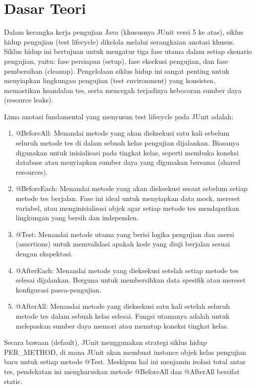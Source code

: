 \documentclass[a4paper,12pt]{article}
\begin{document}
\section{Dasar Teori}
Dalam kerangka kerja pengujian Java (khususnya JUnit versi 5 ke atas), siklus hidup pengujian (test lifecycle) dikelola melalui serangkaian anotasi khusus. Siklus hidup ini bertujuan untuk mengatur tiga fase utama dalam setiap skenario pengujian, yaitu: fase persiapan (setup), fase eksekusi pengujian, dan fase pembersihan (cleanup). Pengelolaan siklus hidup ini sangat penting untuk menyiapkan lingkungan pengujian (test environment) yang konsisten, memastikan keandalan tes, serta mencegah terjadinya kebocoran sumber daya (resource leaks).

Lima anotasi fundamental yang menyusun test lifecycle pada JUnit adalah:
\begin{enumerate}
    \item @BeforeAll: Menandai metode yang akan dieksekusi satu kali sebelum seluruh metode tes di dalam sebuah kelas pengujian dijalankan. Biasanya digunakan untuk inisialisasi pada tingkat kelas, seperti membuka koneksi database atau menyiapkan sumber daya yang digunakan bersama (shared resources).
    
    \item @BeforeEach: Menandai metode yang akan dieksekusi sesaat sebelum setiap metode tes berjalan. Fase ini ideal untuk menyiapkan data mock, mereset variabel, atau menginisialisasi objek agar setiap metode tes mendapatkan lingkungan yang bersih dan independen.
    
    \item @Test: Menandai metode utama yang berisi logika pengujian dan asersi (assertions) untuk memvalidasi apakah kode yang diuji berjalan sesuai dengan ekspektasi.
    
    \item @AfterEach: Menandai metode yang dieksekusi setelah setiap metode tes selesai dijalankan. Berguna untuk membersihkan data spesifik atau mereset konfigurasi pasca-pengujian.
    
    \item @AfterAll: Menandai metode yang dieksekusi satu kali setelah seluruh metode tes dalam sebuah kelas selesai. Fungsi utamanya adalah untuk melepaskan sumber daya memori atau menutup koneksi tingkat kelas.
\end{enumerate}

Secara bawaan (default), JUnit menggunakan strategi siklus hidup PER\_METHOD, di mana JUnit akan membuat instance objek kelas pengujian baru untuk setiap metode @Test. Meskipun hal ini menjamin isolasi total antar tes, pendekatan ini mengharuskan metode @BeforeAll dan @AfterAll bersifat static.
\end{document}
